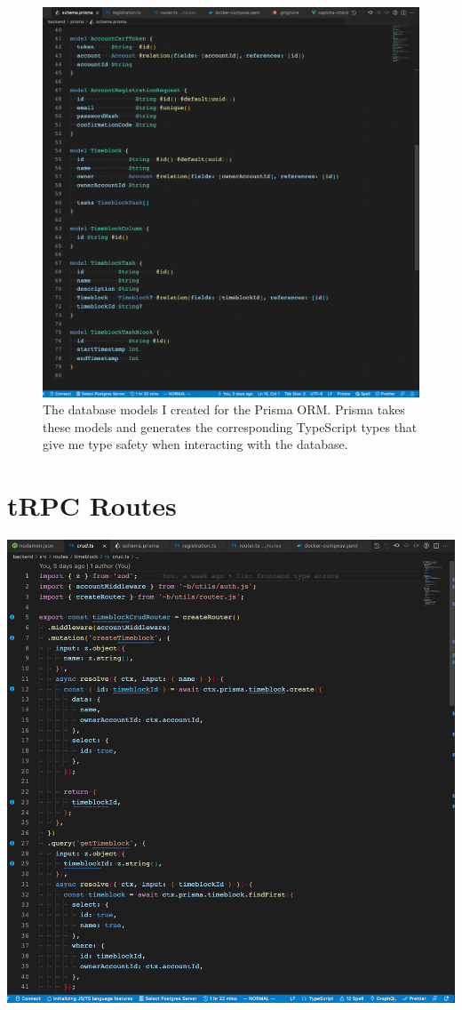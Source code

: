 \documentclass[notitlepage, 12pt]{report}
\begin{document}
\begin{figure}[H]
	\caption{The database models I created for the Prisma ORM. Prisma takes these models and generates the corresponding TypeScript types that give me type safety when interacting with the database.}
	\includegraphics[width=1\textwidth]{backend-database-models.png}
\end{figure}

\section*{tRPC Routes}
\includegraphics[width=1\textwidth]{backend-trpc-routes.png}
\end{document}
